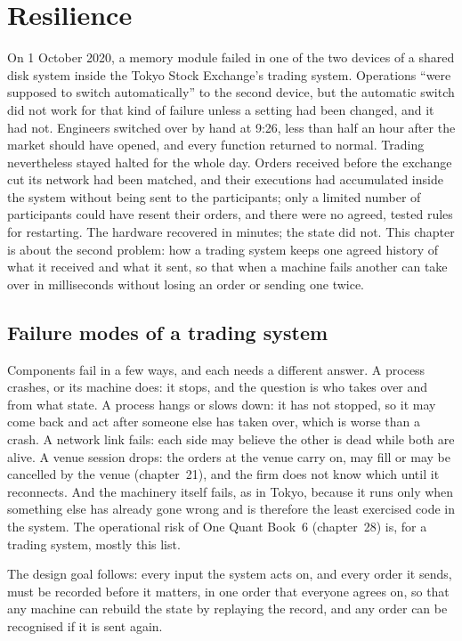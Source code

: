 \chapter{Resilience}\label{ch:ll:resilience}

On 1 October 2020, a memory module failed in one of the two devices of a shared disk system inside the Tokyo Stock
Exchange's trading system. Operations ``were supposed to switch automatically'' to the second device, but the automatic
switch did not work for that kind of failure unless a setting had been changed, and it had not. Engineers switched over by
hand at 9:26, less than half an hour after the market should have opened, and every function returned to normal. Trading
nevertheless stayed halted for the whole day. Orders received before the exchange cut its network had been matched, and
their executions had accumulated inside the system without being sent to the participants; only a limited number of
participants could have resent their orders, and there were no agreed, tested rules for restarting. The hardware recovered in
minutes; the state did not. This chapter is about the second problem: how a trading system keeps one agreed history of what
it received and what it sent, so that when a machine fails another can take over in milliseconds without losing an order
or sending one twice.

\section{Failure modes of a trading system}

Components fail in a few ways, and each needs a different answer. A process crashes, or its machine does: it stops, and the
question is who takes over and from what state. A process hangs or slows down: it has not stopped, so it may come back and
act after someone else has taken over, which is worse than a crash. A network link fails: each side may believe the other
is dead while both are alive. A venue session drops: the orders at the venue carry on, may fill or may be cancelled by the
venue (chapter~21), and the firm does not know which until it reconnects. And the  machinery itself fails, as in
Tokyo, because it runs only when something else has already gone wrong and is therefore the least exercised code in the
system. The operational risk of One Quant Book~6 (chapter~28) is, for a trading system, mostly this list.

The design goal follows: every input the system acts on, and every order it sends, must be recorded before it matters, in
one order that everyone agrees on, so that any machine can rebuild the state by replaying the record, and any order can be
recognised if it is sent again.

